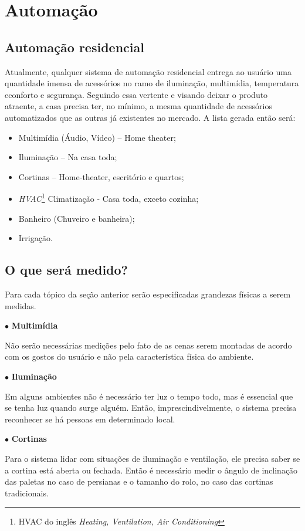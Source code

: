 \chapter{Automação}
\section{Automação residencial}
Atualmente, qualquer sistema de automação residencial entrega ao usuário uma quantidade imensa de acessórios no ramo de iluminação, multimídia, temperatura econforto e segurança. Seguindo essa vertente e visando deixar o produto atraente, a casa precisa ter, no mínimo, a mesma quantidade de acessórios automatizados que as outras já existentes no mercado. A lista gerada então será:

\begin{itemize}
	\item Multimídia (Áudio, Vídeo) – Home theater;
	\item Iluminação – Na casa toda;
	\item Cortinas – Home-theater, escritório e quartos;
	\item \textit{HVAC}\footnote{HVAC do inglês \textit{Heating, Ventilation, Air Conditioning}} Climatização - Casa toda, exceto cozinha;
	\item Banheiro (Chuveiro e banheira);
	\item Irrigação.
\end{itemize}


\section{O que será medido?}

	Para cada tópico da seção anterior serão especificadas grandezas físicas a serem medidas.

$\bullet$ \textbf{Multimídia}

	Não serão necessárias medições pelo fato de as cenas serem montadas de acordo com os gostos do usuário e não pela característica física do ambiente.

$\bullet$ \textbf{Iluminação}

	Em alguns ambientes não é necessário ter luz o tempo todo, mas é essencial que se tenha luz quando surge alguém. Então, imprescindivelmente, o sistema precisa reconhecer se há pessoas em determinado local.

$\bullet$ \textbf{Cortinas}

	Para o sistema lidar com situações de iluminação e ventilação, ele precisa saber se a cortina está aberta ou fechada. Então é necessário medir o ângulo de inclinação das paletas no caso de persianas e o tamanho do rolo, no caso das cortinas tradicionais.

